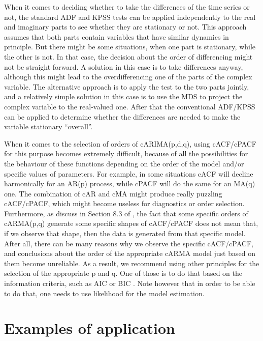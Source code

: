 \documentclass[
]{book}
\begin{document}
When it comes to deciding whether to take the differences of the time series or not, the standard ADF \citep{Dickey1979} and KPSS \citep{Kwiatkowski1992} tests can be applied independently to the real and imaginary parts to see whether they are stationary or not. This approach assumes that both parts contain variables that have similar dynamics in principle. But there might be some situations, when one part is stationary, while the other is not. In that case, the decision about the order of differencing might not be straight forward. A solution in this case is to take differences anyway, although this might lead to the overdifferencing one of the parts of the complex variable. The alternative approach is to apply the test to the two parts jointly, and a relatively simple solution in this case is to use the MDS to project the complex variable to the real-valued one. After that the conventional ADF/KPSS can be applied to determine whether the differences are needed to make the variable stationary ``overall''.

When it comes to the selection of orders of cARIMA(p,d,q), using cACF/cPACF for this purpose becomes extremely difficult, because of all the possibilities for the behaviour of these functions depending on the order of the model and/or specific values of parameters. For example, in some situations cACF will decline harmonically for an AR(p) process, while cPACF will do the same for an MA(q) one. The combination of cAR and cMA might produce really puzzling cACF/cPACF, which might become useless for diagnostics or order selection. Furthermore, as discuss in Section 8.3 of \citet{SvetunkovAdam}, the fact that some specific orders of cARMA(p,q) generate some specific shapes of cACF/cPACF does not mean that, if we observe that shape, then the data is generated from that specific model. After all, there can be many reasons why we observe the specific cACF/cPACF, and conclusions about the order of the appropriate cARMA model just based on them become unreliable. As a result, we recommend using other principles for the selection of the appropriate p and q. One of those is to do that based on the information criteria, such as AIC \citep{Akaike1974} or BIC \citep{Schwarz1978}. Note however that in order to be able to do that, one needs to use likelihood for the model estimation.

\hypertarget{Examples}{%
\chapter{Examples of application}\label{Examples}}
\end{document}
